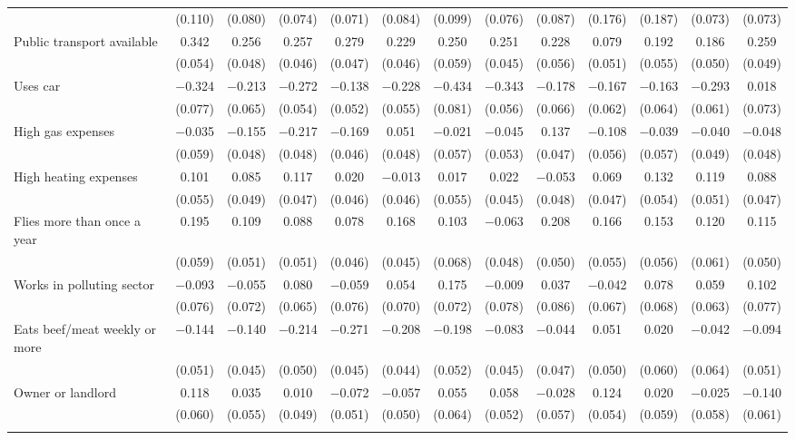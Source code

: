 \begin{tabular}{@{\extracolsep{5pt}}lcccccccccccc}
  & (0.110) & (0.080) & (0.074) & (0.071) & (0.084) & (0.099) & (0.076) & (0.087) & (0.176) & (0.187) & (0.073) & (0.073) \\ 
  Public transport available & 0.342 & 0.256 & 0.257 & 0.279 & 0.229 & 0.250 & 0.251 & 0.228 & 0.079 & 0.192 & 0.186 & 0.259 \\ 
  & (0.054) & (0.048) & (0.046) & (0.047) & (0.046) & (0.059) & (0.045) & (0.056) & (0.051) & (0.055) & (0.050) & (0.049) \\ 
  Uses car & $-$0.324 & $-$0.213 & $-$0.272 & $-$0.138 & $-$0.228 & $-$0.434 & $-$0.343 & $-$0.178 & $-$0.167 & $-$0.163 & $-$0.293 & 0.018 \\ 
  & (0.077) & (0.065) & (0.054) & (0.052) & (0.055) & (0.081) & (0.056) & (0.066) & (0.062) & (0.064) & (0.061) & (0.073) \\ 
  High gas expenses & $-$0.035 & $-$0.155 & $-$0.217 & $-$0.169 & 0.051 & $-$0.021 & $-$0.045 & 0.137 & $-$0.108 & $-$0.039 & $-$0.040 & $-$0.048 \\ 
  & (0.059) & (0.048) & (0.048) & (0.046) & (0.048) & (0.057) & (0.053) & (0.047) & (0.056) & (0.057) & (0.049) & (0.048) \\ 
  High heating expenses & 0.101 & 0.085 & 0.117 & 0.020 & $-$0.013 & 0.017 & 0.022 & $-$0.053 & 0.069 & 0.132 & 0.119 & 0.088 \\ 
  & (0.055) & (0.049) & (0.047) & (0.046) & (0.046) & (0.055) & (0.045) & (0.048) & (0.047) & (0.054) & (0.051) & (0.047) \\ 
  Flies more than once a year & 0.195 & 0.109 & 0.088 & 0.078 & 0.168 & 0.103 & $-$0.063 & 0.208 & 0.166 & 0.153 & 0.120 & 0.115 \\ 
  & (0.059) & (0.051) & (0.051) & (0.046) & (0.045) & (0.068) & (0.048) & (0.050) & (0.055) & (0.056) & (0.061) & (0.050) \\ 
  Works in polluting sector & $-$0.093 & $-$0.055 & 0.080 & $-$0.059 & 0.054 & 0.175 & $-$0.009 & 0.037 & $-$0.042 & 0.078 & 0.059 & 0.102 \\ 
  & (0.076) & (0.072) & (0.065) & (0.076) & (0.070) & (0.072) & (0.078) & (0.086) & (0.067) & (0.068) & (0.063) & (0.077) \\ 
  Eats beef/meat weekly or more & $-$0.144 & $-$0.140 & $-$0.214 & $-$0.271 & $-$0.208 & $-$0.198 & $-$0.083 & $-$0.044 & 0.051 & 0.020 & $-$0.042 & $-$0.094 \\ 
  & (0.051) & (0.045) & (0.050) & (0.045) & (0.044) & (0.052) & (0.045) & (0.047) & (0.050) & (0.060) & (0.064) & (0.051) \\ 
  Owner or landlord & 0.118 & 0.035 & 0.010 & $-$0.072 & $-$0.057 & 0.055 & 0.058 & $-$0.028 & 0.124 & 0.020 & $-$0.025 & $-$0.140 \\ 
  & (0.060) & (0.055) & (0.049) & (0.051) & (0.050) & (0.064) & (0.052) & (0.057) & (0.054) & (0.059) & (0.058) & (0.061) \\ 
 \hline \\[-1.8ex] 


\end{tabular}
